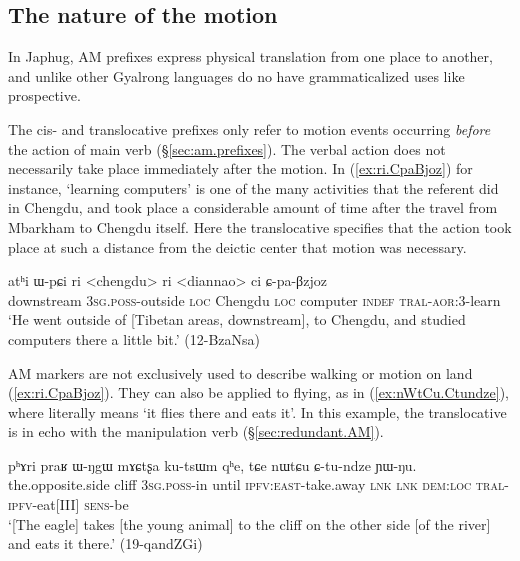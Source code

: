 \subsection{The nature of the motion} \label{sec:nature.of.motion.AM}
In Japhug, AM prefixes express physical translation from one place to another, and unlike other Gyalrong languages do no have grammaticalized uses like prospective. 

The cis- and translocative prefixes only refer to motion events occurring \textit{before} the action of main verb (§\ref{sec:am.prefixes}). The verbal action does not necessarily take place immediately after the motion. In (\ref{ex:ri.CpaBjoz}) for instance, `learning computers' is one of the many activities that the referent did in Chengdu, and took place a considerable amount of time after the travel from Mbarkham to Chengdu itself. Here the translocative specifies that the action took place at such a distance from the deictic center that motion was necessary.

\begin{exe}
\ex \label{ex:ri.CpaBjoz} 
\gll atʰi ɯ-pɕi ri <chengdu> ri <diannao> ci ɕ-pa-βzjoz \\
downstream \textsc{3sg}.\textsc{poss}-outside \textsc{loc} Chengdu \textsc{loc} computer \textsc{indef} \textsc{tral}-\textsc{aor}:3\flobv{}-learn \\
\glt `He went outside of [Tibetan areas, downstream], to Chengdu, and studied computers there a little bit.' (12-BzaNsa)
\end{exe}

AM markers are not exclusively used to describe walking or motion on land (\ref{ex:ri.CpaBjoz}). They can also be applied to flying, as in (\ref{ex:nWtCu.Ctundze}), where  literally means `it flies there and eats it'. In this example, the translocative is in echo with the manipulation verb  (§\ref{sec:redundant.AM}).

\begin{exe}
\ex \label{ex:nWtCu.Ctundze}
\gll pʰɤri praʁ ɯ-ŋgɯ mɤɕtʂa ku-tsɯm qʰe, tɕe nɯtɕu ɕ-tu-ndze ɲɯ-ŋu. \\
the.opposite.side cliff \textsc{3sg}.\textsc{poss}-in until  \textsc{ipfv}:\textsc{east}-take.away \textsc{lnk} \textsc{lnk} \textsc{dem}:\textsc{loc} \textsc{tral}-\textsc{ipfv}-eat[III] \textsc{sens}-be \\
\glt `[The eagle] takes [the young animal] to the cliff on the other side [of the river] and eats it there.' (19-qandZGi)
\end{exe}


